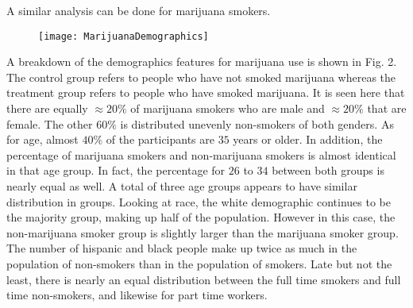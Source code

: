 \documentclass[a4paper, 10pt, conference]{ieeeconf}
\begin{document}
A similar analysis can be done for marijuana smokers. 
\begin{figure} \texttt{[image: MarijuanaDemographics]}  \end{figure} 
\parindent 10pt A breakdown of the demographics features for marijuana use is shown in Fig. 2. The control group refers to people who have not smoked marijuana whereas the treatment group refers to people who have smoked marijuana. It is seen here that there are equally $\approx 20\%$ of marijuana smokers who are male and $\approx 20\%$ that are female. The other $60\%$ is distributed unevenly non-smokers of both genders. As for age, almost $40\%$ of the participants are $35$ years or older. In addition, the percentage of marijuana smokers and non-marijuana smokers is almost identical in that age group. In fact, the percentage for $26$ to $34$ between both groups is nearly equal as well. A total of three age groups appears to have similar distribution in groups. Looking at race, the white demographic continues to be the majority group, making up half of the population. However in this case, the non-marijuana smoker group is slightly larger than the marijuana smoker group. The number of hispanic and black people make up twice as much in the population of non-smokers than in the population of smokers. Late but not the least, there is nearly an equal distribution between the full time smokers and full time non-smokers, and likewise for part time workers. 
\end{document}
